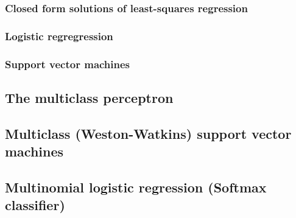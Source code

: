 \subsubsection{Closed form solutions of least-squares regression}

\subsubsection{Logistic regregression}

\subsubsection{Support vector machines}

\subsection{The multiclass perceptron}

\subsection{Multiclass (Weston-Watkins) support vector machines}

\subsection{Multinomial logistic regression (Softmax classifier)}

